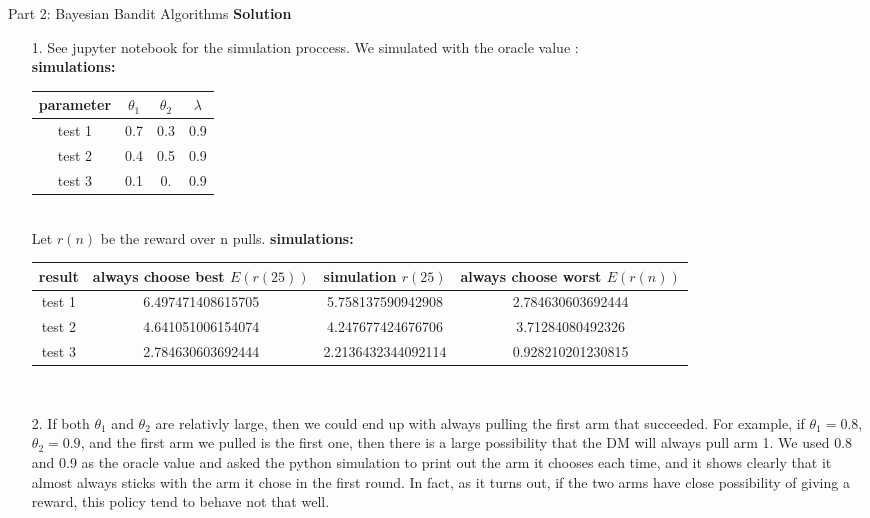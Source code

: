 \documentclass{article}
\newcommand{\solution}{\textbf{\Large Solution}}
\begin{document}
\begin{homeworkProblem}{Part 2: Bayesian Bandit Algorithms}
    \solution
    \begin{enumerate}
        \item[1.]
        See jupyter notebook for the simulation proccess. We simulated with the oracle value :\\
        \textbf{simulations:}\\
        \begin{tabular}[t]{|c|c|c|c|}
        \hline
        parameter & $\theta_1$ & $\theta_2$ & $\lambda$ \\
        \hline
        test 1 & 0.7 & 0.3 & 0.9 \\
        \hline
        test 2 & 0.4 & 0.5 & 0.9 \\
        \hline
        test 3 & 0.1 & 0. & 0.9 \\
        \hline
        \end{tabular}\\
        Let $r(n)$ be the reward over n pulls.
        \textbf{simulations:}\\
        \begin{tabular}[t]{|c|c|c|c|}
        \hline
        result & always choose best $E(r(25))$ & simulation $r(25)$ & always choose worst $E(r(n))$ \\
        \hline
        test 1 & 6.497471408615705 & 5.758137590942908 & 2.784630603692444 \\
        \hline
        test 2 & 4.641051006154074 & 4.247677424676706 & 3.71284080492326 \\
        \hline
        test 3 & 2.784630603692444 & 2.2136432344092114 & 0.928210201230815 \\
        \hline
        \end{tabular}\\
        \item[2.]
        If both $\theta_1$ and $\theta_2$ are relativly large, then we could end up with always pulling the first arm that succeeded.
        For example, if $\theta_1 = 0.8$, $\theta_2 = 0.9$, and the first arm we pulled is the first one, then there is a large possibility that the DM will always pull arm 1.
        We used 0.8 and 0.9 as the oracle value and asked the python simulation to print out the arm it chooses each time, and it shows clearly that it almost always sticks with the arm it chose in the first round.
        In fact, as it turns out, if the two arms have close possibility of giving a reward, this policy tend to behave not that well.

\end{enumerate}
\end{homeworkProblem}
\end{document}
